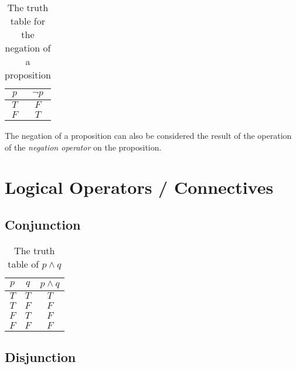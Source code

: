 \documentclass[12pt letter]{report}
\begin{document}
\begin{table}[h!]
	\centering
	\begin{tabular}{|c|c|}
		\hline
		$p$ & $\neg p$ \\[0.5ex]
		\hline
		\hline
		$T$ & $F$      \\
		$F$ & $T$      \\
		\hline
	\end{tabular}
	\caption{The truth table for the negation of a proposition}
	\label{tab:1}
\end{table}

The negation of a proposition can also be considered the result of the operation of the \textit{negation operator} on
the proposition.

\section{Logical Operators / Connectives}

\subsection{Conjunction}

\begin{table}[h!]
	\caption{The truth table of $p \wedge q$}\label{tab:2}
	\begin{center}
		\begin{tabular}{|c c|c|}
			\hline
			$p$ & $q$ & $p \wedge q$ \\[0.5ex]
			\hline
			\hline
			$T$ & $T$ & $T$          \\
			$T$ & $F$ & $F$          \\
			$F$ & $T$ & $F$          \\
			$F$ & $F$ & $F$          \\
			\hline
		\end{tabular}
	\end{center}
\end{table}


\subsection{Disjunction}
\end{document}
